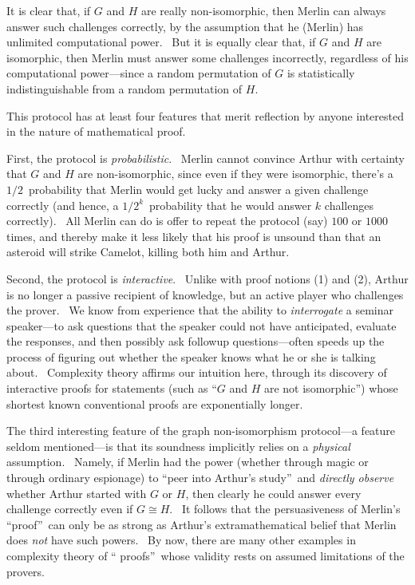\documentclass[12pt,onecolumn]{article}%
\begin{document}
It is clear that, if $G$ and $H$ are really non-isomorphic, then Merlin can
always answer such challenges correctly, by the assumption that he (Merlin)
has unlimited computational power. \ But it is equally clear that, if $G$ and
$H$ are isomorphic, then Merlin must answer some challenges incorrectly,
regardless of his computational power---since a random permutation of $G$ is
statistically indistinguishable from a random permutation of $H$.

This protocol has at least four features that merit reflection by anyone
interested in the nature of mathematical proof.

First, the protocol is \textit{probabilistic}. \ Merlin cannot convince Arthur
with certainty that $G$ and $H$ are non-isomorphic, since even if they were
isomorphic, there's a $1/2$\ probability that Merlin would get lucky and
answer a given challenge correctly (and hence, a $1/2^{k}$\ probability that
he would answer $k$ challenges correctly). \ All Merlin can do is offer to
repeat the protocol (say) $100$ or $1000$ times, and thereby make it less
likely that his proof is unsound than that an asteroid will strike Camelot,
killing both him and Arthur.

Second, the protocol is \textit{interactive}. \ Unlike with proof notions (1)
and (2), Arthur is no longer a passive recipient of knowledge, but an active
player who challenges the prover. \ We know from experience that the ability
to \textit{interrogate} a seminar speaker---to ask questions that the speaker
could not have anticipated, evaluate the responses, and then possibly ask
followup questions---often speeds up the process of figuring out whether the
speaker knows what he or she is talking about. \ Complexity theory affirms our
intuition here, through its discovery of interactive proofs for statements
(such as \textquotedblleft$G$ and $H$ are not isomorphic\textquotedblright)
whose shortest known conventional proofs are exponentially longer.

The third interesting feature of the graph non-isomorphism protocol---a
feature seldom mentioned---is that its soundness implicitly relies on a
\textit{physical} assumption. \ Namely, if Merlin had the power (whether
through magic or through ordinary espionage) to \textquotedblleft peer into
Arthur's study\textquotedblright\ and \textit{directly observe} whether Arthur
started with $G$ or $H$, then clearly he could answer every challenge
correctly even if $G\cong H$. \ It follows that the persuasiveness of Merlin's
\textquotedblleft proof\textquotedblright\ can only be as strong as Arthur's
extramathematical belief that Merlin does \textit{not} have such powers. \ By
now, there are many other examples in complexity theory of \textquotedblleft
proofs\textquotedblright\ whose validity rests on assumed limitations of the provers.
\end{document}
